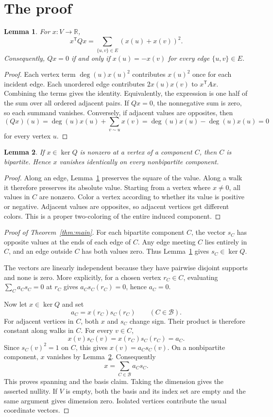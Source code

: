 \documentclass[11pt]{article}
\newtheorem{lemma}{Lemma}
\begin{document}
\section{The proof}
\begin{lemma}\label{lem:ker}
For $x:V\to\mathbb R$,
\[
x^{\mathsf T}Qx=\sum_{\{u,v\}\in E}(x(u)+x(v))^2.
\]
Consequently, $Qx=0$ if and only if $x(u)=-x(v)$ for every edge
$\{u,v\}\in E$.
\end{lemma}
\begin{proof}
Each vertex term $\deg(u)x(u)^2$ contributes $x(u)^2$ once for each
incident edge. Each unordered edge contributes $2x(u)x(v)$ to
$x^{\mathsf T}Ax$. Combining the terms gives the identity. Equivalently,
the expression is one half of the sum over all ordered adjacent pairs.
If $Qx=0$, the nonnegative sum is zero, so each summand vanishes.
Conversely, if adjacent values are opposites, then
\[
(Qx)(u)=\deg(u)x(u)+\sum_{v\sim u}x(v)
=\deg(u)x(u)-\deg(u)x(u)=0
\]
for every vertex $u$.
\end{proof}

\begin{lemma}\label{lem:nonbip}
If $x\in\ker Q$ is nonzero at a vertex of a component $C$, then $C$
is bipartite. Hence $x$ vanishes identically on every nonbipartite
component.
\end{lemma}
\begin{proof}
Along an edge, Lemma~\ref{lem:ker} preserves the square of the value.
Along a walk it therefore preserves its absolute value. Starting from
a vertex where $x\ne0$, all values in $C$ are nonzero. Color a vertex
according to whether its value is positive or negative. Adjacent values
are opposites, so adjacent vertices get different colors. This is a
proper two-coloring of the entire induced component.
\end{proof}

\begin{proof}[Proof of Theorem~\ref{thm:main}]
For each bipartite component $C$, the vector $s_C$ has opposite values
at the ends of each edge of $C$. Any edge meeting $C$ lies entirely in
$C$, and an edge outside $C$ has both values zero. Thus
Lemma~\ref{lem:ker} gives $s_C\in\ker Q$.

The vectors are linearly independent because they have pairwise
disjoint supports and none is zero. More explicitly, for a chosen
vertex $r_C\in C$, evaluating $\sum_C a_Cs_C=0$ at $r_C$ gives
$a_Cs_C(r_C)=0$, hence $a_C=0$.

Now let $x\in\ker Q$ and set
\[
a_C=x(r_C)s_C(r_C)\qquad(C\in\mathcal B).
\]
For adjacent vertices in $C$, both $x$ and $s_C$ change sign. Their
product is therefore constant along walks in $C$. For every $v\in C$,
\[
x(v)s_C(v)=x(r_C)s_C(r_C)=a_C.
\]
Since $s_C(v)^2=1$ on $C$, this gives $x(v)=a_Cs_C(v)$.
On a nonbipartite component, $x$ vanishes by Lemma~\ref{lem:nonbip}.
Consequently
\[
x=\sum_{C\in\mathcal B}a_Cs_C.
\]
This proves spanning and the basis claim. Taking the dimension gives
the asserted nullity. If $V$ is empty, both the basis and its index set
are empty and the same argument gives dimension zero. Isolated vertices
contribute the usual coordinate vectors.
\end{proof}
\end{document}
